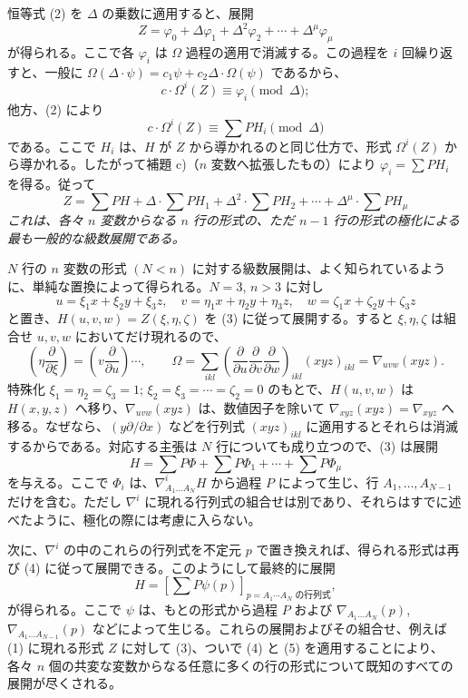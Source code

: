 \documentclass[11pt]{article}
\begin{document}
恒等式 (2) を $\Delta$ の乗数に適用すると、展開
\[
  Z=\varphi_0+\Delta\varphi_1+\Delta^2\varphi_2+\cdots+\Delta^\mu\varphi_\mu
\]
が得られる。ここで各 $\varphi_i$ は $\Omega$ 過程の適用で消滅する。この過程を $i$ 回繰り返すと、一般に $\Omega(\Delta\cdot\psi)=c_1\psi+c_2\Delta\cdot\Omega(\psi)$ であるから、
\[
  c\cdot \Omega^i(Z)\equiv\varphi_i\pmod{\Delta};
\]
他方、(2) により
\[
  c\cdot\Omega^i(Z)\equiv\sum PH_i\pmod{\Delta}
\]
である。ここで $H_i$ は、$H$ が $Z$ から導かれるのと同じ仕方で、形式 $\Omega^i(Z)$ から導かれる。したがって補題 c)（$n$ 変数へ拡張したもの）により $\varphi_i=\sum PH_i$ を得る。従って
\begin{equation}
  Z=\sum PH+\Delta\cdot\sum PH_1+\Delta^2\cdot\sum PH_2+
  \cdots+\Delta^\mu\cdot\sum PH_\mu
\tag{3}
\end{equation}
\emph{これは、各々 $n$ 変数からなる $n$ 行の形式の、ただ $n-1$ 行の形式の極化による最も一般的な級数展開である。}

$N$ 行の $n$ 変数の形式 $(N<n)$ に対する級数展開は、よく知られているように、単純な置換によって得られる。$N=3$, $n>3$ に対し
\[
  u=\xi_1x+\xi_2y+\xi_3z,
  \quad v=\eta_1x+\eta_2y+\eta_3z,
  \quad w=\zeta_1x+\zeta_2y+\zeta_3z
\]
と置き、$H(u,v,w)=Z(\xi,\eta,\zeta)$ を (3) に従って展開する。すると $\xi,\eta,\zeta$ は組合せ $u,v,w$ においてだけ現れるので、
\[
  \left(\eta\frac{\partial}{\partial \xi}\right)=
  \left(v\frac{\partial}{\partial u}\right)\cdots,
  \qquad
  \Omega=\sum_{ikl}\left(\frac{\partial}{\partial u}
  \frac{\partial}{\partial v}
  \frac{\partial}{\partial w}\right)_{ikl}(xyz)_{ikl}
  =\nabla_{uvw}(xyz).
\]
特殊化 $\xi_1=\eta_2=\zeta_3=1$; $\xi_2=\xi_3=\cdots=\zeta_2=0$ のもとで、$H(u,v,w)$ は $H(x,y,z)$ へ移り、$\nabla_{uvw}(xyz)$ は、数値因子を除いて $\nabla_{xyz}(xyz)=\nabla_{xyz}$ へ移る。なぜなら、$(y\partial/\partial x)$ などを行列式 $(xyz)_{ikl}$ に適用するとそれらは消滅するからである。対応する主張は $N$ 行についても成り立つので、(3) は展開
\begin{equation}
  H=\sum P\Phi+\sum P\Phi_1+\cdots+\sum P\Phi_\mu
\tag{4}
\end{equation}
を与える。ここで $\Phi_i$ は、$\nabla^i_{A_1\ldots A_N}H$ から過程 $P$ によって生じ、行 $A_1,
\ldots,A_{N-1}$ だけを含む。ただし $\nabla^i$ に現れる行列式の組合せは別であり、それらはすでに述べたように、極化の際には考慮に入らない。

次に、$\nabla^i$ の中のこれらの行列式を不定元 $p$ で置き換えれば、得られる形式は再び (4) に従って展開できる。このようにして最終的に展開
\begin{equation}
  H=\left[\sum P\psi(p)\right]_{p=\text{$A_1\cdots A_N$ の行列式}},
\tag{5}
\end{equation}
が得られる。ここで $\psi$ は、もとの形式から過程 $P$ および $\nabla_{A_1\ldots A_N}(p)$, $\nabla_{A_1\ldots A_{N-1}}(p)$ などによって生じる。これらの展開およびその組合せ、例えば (1) に現れる形式 $Z$ に対して (3)、ついで (4) と (5) を適用することにより、各々 $n$ 個の共変な変数からなる任意に多くの行の形式について既知のすべての展開が尽くされる。
\end{document}
